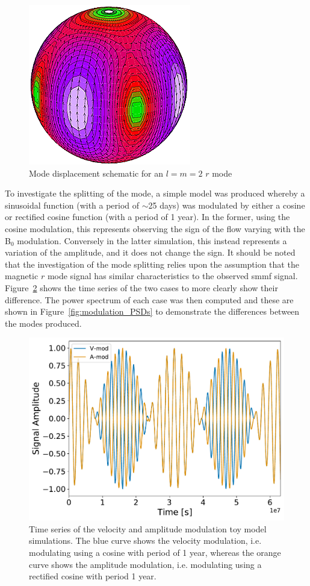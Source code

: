 \begin{figure}[!ht]
	\centering
	\includegraphics[scale=0.7]{l2m2.png}
	\caption{Mode displacement schematic for an $l=m=2$ $r$ mode \citep{strohmayer_neutron_2014}}  \label{fig:l2m2}
\end{figure}

To investigate the splitting of the mode, a simple model was produced whereby a sinusoidal function (with a period of $\sim$25 days) was modulated by either a cosine or rectified cosine function (with a period of 1 year). In the former, using the cosine modulation, this represents observing the sign of the flow varying with the B$_0$ modulation. Conversely in the latter simulation, this instead represents a variation of the amplitude, and it does not change the sign. It should be noted that the investigation of the mode splitting relies upon the assumption that the magnetic $r$ mode signal has similar characteristics to the observed \gls{smmf} signal. Figure~\ref{fig:modulation} shows the time series of the two cases to more clearly show their difference. The power spectrum of each case was then computed and these are shown in Figure~\ref{fig:modulation_PSDs} to demonstrate the differences between the modes produced.

\begin{figure}[!ht]
	\centering
	\includegraphics[width=0.65\columnwidth]{modulation_plot.pdf}
	\caption{Time series of the velocity and amplitude modulation toy model simulations. The blue curve shows the velocity modulation, i.e. modulating using a cosine with period of 1 year, whereas the orange curve shows the amplitude modulation, i.e. modulating using a rectified cosine with period 1 year.}  \label{fig:modulation}
\end{figure}

